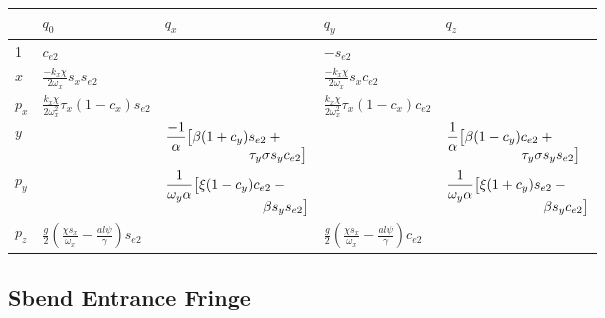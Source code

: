 \begin{center}
\begin{tabular}{lllll} \toprule
        & $q_0$    & $q_x$ & $q_y$     & $q_z$ \\ \midrule
  1     & $c_{e2}$ &       & $-s_{e2}$ &       \\ \addlinespace[1ex]
  $x$   & $\frac{-k_x \chi}{2 \omega_x} s_x s_{e2}$            &   &
    $\frac{-k_x \chi}{2 \omega_x} s_x c_{e2}$ & \\ \addlinespace[1ex]
  $p_x$ & $\frac{k_x \chi}{2\omega_x^2} \tau_x (1-c_x) s_{e2}$ &   &
    $\frac{k_x \chi}{2 \omega_x^2} \tau_x \left(1-c_x\right) c_{e2}$ & \\ \addlinespace[1ex]
  $y$   &          &
    {$\begin{aligned}
      \frac{-1}{\alpha} &\bigl[ \beta (1+ c_y) s_{e2} +{} \\[-1.5ex]
      & \hskip4.5em \tau_y \sigma s_y c_{e2} \bigr]
    \end{aligned}$} &  &
    {$\begin{aligned}
       \frac{1}{\alpha} &\bigl[ \beta (1-c_y) c_{e2} + {} \\[-1.5ex]
       & \hskip4.5em \tau_y \sigma s_y s_{e2} \bigr]
    \end{aligned}$} \\ \addlinespace[1ex]
  $p_y$ &          &
    {$\begin{aligned}
      \frac{1}{\omega_y \alpha} &\bigl[ \xi (1 - c_y) c_{e2} - {} \\[-1.5ex]
      & \hskip5em \beta s_y s_{e2} \bigr]
    \end{aligned}$} &   &
    {$\begin{aligned}
      \frac{1}{\omega_y \alpha} &\bigl[ \xi (1+c_y) s_{e2} - {} \\[-1.5ex]
      & \hskip5em \beta s_y c_{e2}\bigr]
    \end{aligned}$} \\ \addlinespace[1ex]
  $p_z$ & $\frac{g}{2}\left(\frac{\chi s_x}{\omega_x} - \frac{a l \psi}{\gamma}\right) s_{e2}$ &    &
    $\frac{g}{2}\left(\frac{\chi s_x}{\omega_x} - \frac{a l \psi}{\gamma}\right) c_{e2}$ & \\
  \bottomrule
  \end{tabular}
\end{center}

\subsection{Sbend Entrance Fringe}

